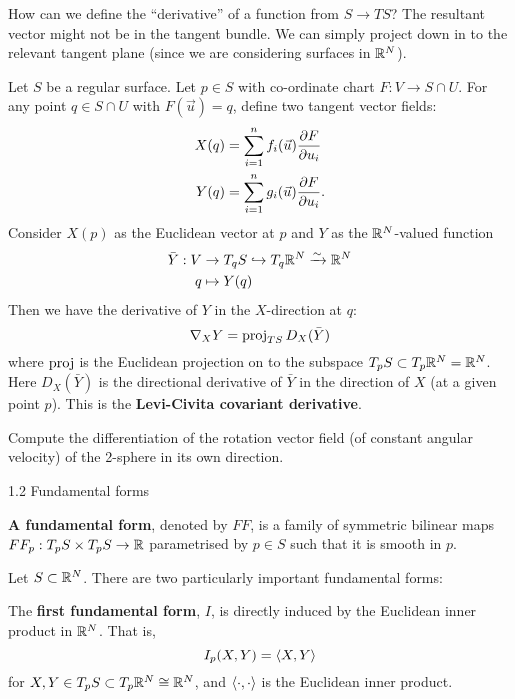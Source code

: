 How can we define the ``derivative'' of a function from $S \to TS$?
The resultant vector might not be in the tangent bundle.
We can simply project down in to the relevant tangent plane (since we are considering surfaces in $\mathbb{R}^N$).

\begin{defn}[1.5]
  Let $S$ be a regular surface.
  Let $p \in S$ with co-ordinate chart $F: V \to S \cap U$.
  For any point $q \in S \cap U$ with $F(\vec u)=q$, define two tangent vector fields:
  \begin{align*}
    X(q) &= \sum_{i=1}^n f_i(\vec u) \frac{\partial F}{\partial u_i} \\
    Y(q) &= \sum_{i=1}^n g_i(\vec u) \frac{\partial F}{\partial u_i}.
  \end{align*}
  Consider $X(p)$ as the Euclidean vector at $p$ and $Y$ as the $\mathbb{R}^N$-valued function
  \begin{align*}
    \bar Y: V &\to T_qS \hookrightarrow T_q\mathbb{R}^N \xrightarrow{\sim} \mathbb{R}^N \\
    q &\mapsto Y(q)
  \end{align*}
  Then we have the derivative of $Y$ in the $X$-direction at $q$:
  \[ \nabla_XY = \operatorname{proj}_{TS} D_X(\bar Y) \]
  where $\operatorname{proj}$ is the Euclidean projection on to the subspace $T_pS \subset T_p\mathbb{R}^N = \mathbb{R}^N$.
  Here $D_X(\bar Y)$ is the directional derivative of $\bar Y$ in the direction of $X$ (at a given point $p$).
  This is the \textbf{Levi-Civita covariant derivative}.
\end{defn}

\begin{exer}
  Compute the differentiation of the rotation vector field (of constant angular velocity) of the 2-sphere in its own direction.
\end{exer}

1.2 Fundamental forms

\begin{defn}
  \textbf{A fundamental form}, denoted by $FF$, is a family of symmetric bilinear maps $FF_p: T_pS \times T_pS \to \mathbb{R}$ parametrised by $p \in S$ such that it is smooth in $p$.
\end{defn}

Let $S \subset \mathbb{R}^N$.
There are two particularly important fundamental forms:

\begin{defn}[1.7]
The \textbf{first fundamental form}, $I$, is directly induced by the Euclidean inner product in $\mathbb{R}^N$.
  That is,
  \[ I_p(X,Y) = {\left\langle X,Y \right\rangle} \]
  for $X,Y \in T_pS \subset T_p\mathbb{R}^N \cong \mathbb{R}^N$, and ${\left\langle \cdot,\cdot \right\rangle}$ is the Euclidean inner product.
\end{defn}

